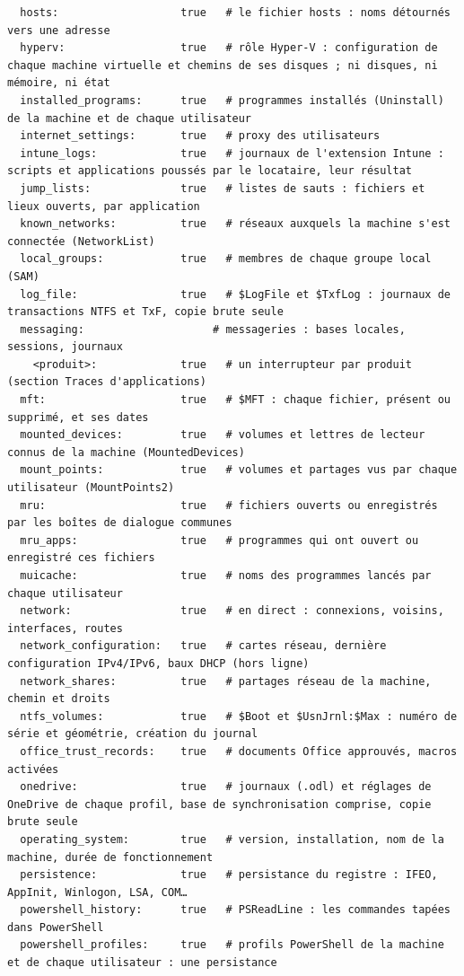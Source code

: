 \documentclass[11pt,a4paper,oneside]{report}
\begin{document}
\begin{lstlisting}
  hosts:                   true   # le fichier hosts : noms détournés vers une adresse
  hyperv:                  true   # rôle Hyper-V : configuration de chaque machine virtuelle et chemins de ses disques ; ni disques, ni mémoire, ni état
  installed_programs:      true   # programmes installés (Uninstall) de la machine et de chaque utilisateur
  internet_settings:       true   # proxy des utilisateurs
  intune_logs:             true   # journaux de l'extension Intune : scripts et applications poussés par le locataire, leur résultat
  jump_lists:              true   # listes de sauts : fichiers et lieux ouverts, par application
  known_networks:          true   # réseaux auxquels la machine s'est connectée (NetworkList)
  local_groups:            true   # membres de chaque groupe local (SAM)
  log_file:                true   # $LogFile et $TxfLog : journaux de transactions NTFS et TxF, copie brute seule
  messaging:                    # messageries : bases locales, sessions, journaux
    <produit>:             true   # un interrupteur par produit (section Traces d'applications)
  mft:                     true   # $MFT : chaque fichier, présent ou supprimé, et ses dates
  mounted_devices:         true   # volumes et lettres de lecteur connus de la machine (MountedDevices)
  mount_points:            true   # volumes et partages vus par chaque utilisateur (MountPoints2)
  mru:                     true   # fichiers ouverts ou enregistrés par les boîtes de dialogue communes
  mru_apps:                true   # programmes qui ont ouvert ou enregistré ces fichiers
  muicache:                true   # noms des programmes lancés par chaque utilisateur
  network:                 true   # en direct : connexions, voisins, interfaces, routes
  network_configuration:   true   # cartes réseau, dernière configuration IPv4/IPv6, baux DHCP (hors ligne)
  network_shares:          true   # partages réseau de la machine, chemin et droits
  ntfs_volumes:            true   # $Boot et $UsnJrnl:$Max : numéro de série et géométrie, création du journal
  office_trust_records:    true   # documents Office approuvés, macros activées
  onedrive:                true   # journaux (.odl) et réglages de OneDrive de chaque profil, base de synchronisation comprise, copie brute seule
  operating_system:        true   # version, installation, nom de la machine, durée de fonctionnement
  persistence:             true   # persistance du registre : IFEO, AppInit, Winlogon, LSA, COM…
  powershell_history:      true   # PSReadLine : les commandes tapées dans PowerShell
  powershell_profiles:     true   # profils PowerShell de la machine et de chaque utilisateur : une persistance

\end{lstlisting}
\end{document}

